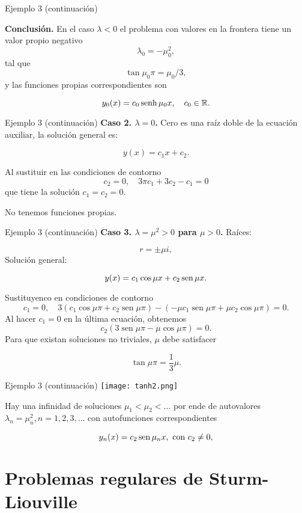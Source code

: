 {Ejemplo 3 (continuación)}
 

\textbf{Conclusión.} En el caso $\lambda<0$ el problema con valores en la frontera tiene un valor propio negativo 
$$\lambda_{0}=-\mu_{0}^{2},$$
tal que 
$$\tan \mu_{0} \pi=\mu_{0} / 3,$$
y las funciones propias correspondientes son 

$$y_{0}(x)=c_{0} \operatorname{senh} \mu_{0} x,\quad c_{0} \in\rr.$$ 

 


 

{Ejemplo 3 (continuación)}
\textbf{Caso 2. $\lambda=0$.} Cero es una raíz doble de la ecuación auxiliar, la solución general es:

$$y(x)=c_{1} x+c_{2}.$$ 

Al sustituir en las condiciones de contorno
$$
c_{2}=0, \quad 3 \pi c_{1}+3 c_{2}-c_{1}=0
$$
que tiene la solución $c_{1}=c_{2}=0$. 

No tenemos funciones propias.
 


 

{Ejemplo 3 (continuación)}
\textbf{Caso 3. $\lambda=\mu^{2}>0$  para $\mu>0$.} Raíces:

$$r=\pm \mu i,$$
Solución general: 

$$y(x)=c_{1} \cos \mu x+c_{2}\sen \mu x .$$

Sustituyenco en condiciones de contorno
$$
c_{1}=0, \quad 3\left(c_{1} \cos \mu \pi+c_{2} \operatorname{sen} \mu \pi\right)-\left(-\mu c_{1} \operatorname{sen} \mu \pi+\mu c_{2} \cos \mu \pi\right)=0 .
$$
$\mathrm{Al}$ hacer $c_{1}=0$ en la última ecuación, obtenemos
$$
c_{2}(3 \operatorname{sen} \mu \pi-\mu \cos \mu \pi)=0 .
$$
Para que existan soluciones no triviales, $\mu$ debe satisfacer 

$$\tan \mu \pi=\frac{1}{3} \mu.$$

 


 

{Ejemplo 3 (continuación)}
\texttt{[image: tanh2.png]}

Hay una infinidad de soluciones $\mu_{1}<\mu_{2}<\ldots $ por ende de autovalores $\lambda_{n}=\mu_{n}^{2}, n=1,2,3, \ldots$ con autofunciones correspondientes  

$$y_{n}(x)=c_{2}\sen \mu_{n} x, \hbox{ con }c_{2} \neq 0,$$  






\section{Problemas regulares de Sturm-Liouville}



